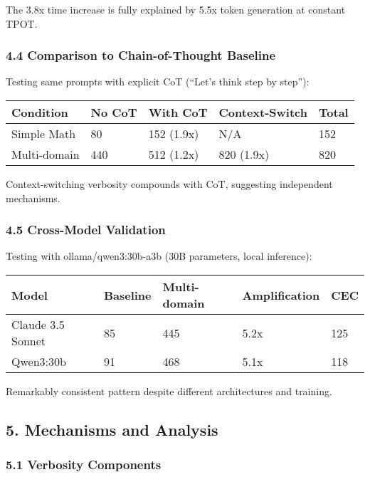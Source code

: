 \documentclass[
  11pt]{article}
\begin{document}
The 3.8x time increase is fully explained by 5.5x token generation at
constant TPOT.

\subsubsection{4.4 Comparison to Chain-of-Thought
Baseline}\label{comparison-to-chain-of-thought-baseline}

Testing same prompts with explicit CoT (``Let's think step by step''):

\begin{longtable}[]{@{}lllll@{}}
\toprule\noalign{}
Condition & No CoT & With CoT & Context-Switch & Total \\
\midrule\noalign{}
\endhead
\bottomrule\noalign{}
\endlastfoot
Simple Math & 80 & 152 (1.9x) & N/A & 152 \\
Multi-domain & 440 & 512 (1.2x) & 820 (1.9x) & 820 \\
\end{longtable}

Context-switching verbosity compounds with CoT, suggesting independent
mechanisms.

\subsubsection{4.5 Cross-Model Validation}\label{cross-model-validation}

Testing with ollama/qwen3:30b-a3b (30B parameters, local inference):

\begin{longtable}[]{@{}lllll@{}}
\toprule\noalign{}
Model & Baseline & Multi-domain & Amplification & CEC \\
\midrule\noalign{}
\endhead
\bottomrule\noalign{}
\endlastfoot
Claude 3.5 Sonnet & 85 & 445 & 5.2x & 125 \\
Qwen3:30b & 91 & 468 & 5.1x & 118 \\
\end{longtable}

Remarkably consistent pattern despite different architectures and
training.

\subsection{5. Mechanisms and Analysis}\label{mechanisms-and-analysis}

\subsubsection{5.1 Verbosity Components}\label{verbosity-components}
\end{document}
